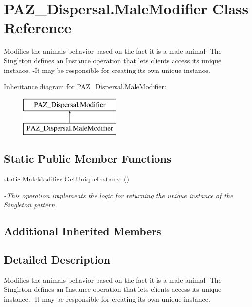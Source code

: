 \hypertarget{class_p_a_z___dispersal_1_1_male_modifier}{\section{P\-A\-Z\-\_\-\-Dispersal.\-Male\-Modifier Class Reference}
\label{class_p_a_z___dispersal_1_1_male_modifier}
}


Modifies the animals behavior based on the fact it is a male animal -\/\-The Singleton defines an Instance operation that lets clients access its unique instance. -\/\-It may be responsible for creating its own unique instance.  


Inheritance diagram for P\-A\-Z\-\_\-\-Dispersal.\-Male\-Modifier\-:\begin{figure}[H]
\begin{center}
\leavevmode
\includegraphics[height=2.000000cm]{class_p_a_z___dispersal_1_1_male_modifier}
\end{center}
\end{figure}
\subsection*{Static Public Member Functions}
\begin{DoxyCompactItemize}
\item 
static \hyperlink{class_p_a_z___dispersal_1_1_male_modifier}{Male\-Modifier} \hyperlink{class_p_a_z___dispersal_1_1_male_modifier_a7594e56ff2008c3b781d5d4bfc86a059}{Get\-Unique\-Instance} ()
\begin{DoxyCompactList}\small\item\em -\/\-This operation implements the logic for returning the unique instance of the Singleton pattern. \end{DoxyCompactList}\end{DoxyCompactItemize}
\subsection*{Additional Inherited Members}


\subsection{Detailed Description}
Modifies the animals behavior based on the fact it is a male animal -\/\-The Singleton defines an Instance operation that lets clients access its unique instance. -\/\-It may be responsible for creating its own unique instance. 



